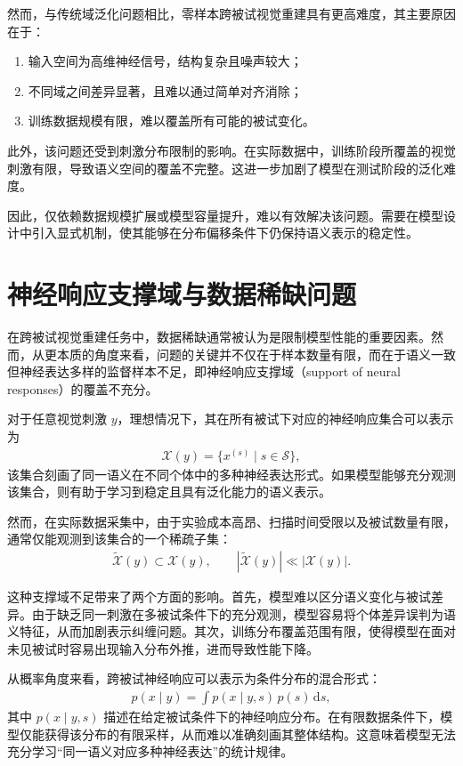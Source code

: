 然而，与传统域泛化问题相比，零样本跨被试视觉重建具有更高难度，其主要原因在于：
\begin{enumerate}
  \item 输入空间为高维神经信号，结构复杂且噪声较大；
  \item 不同域之间差异显著，且难以通过简单对齐消除；
  \item 训练数据规模有限，难以覆盖所有可能的被试变化。
\end{enumerate}

此外，该问题还受到刺激分布限制的影响。在实际数据中，训练阶段所覆盖的视觉刺激有限，导致语义空间的覆盖不完整。这进一步加剧了模型在测试阶段的泛化难度。

因此，仅依赖数据规模扩展或模型容量提升，难以有效解决该问题。需要在模型设计中引入显式机制，使其能够在分布偏移条件下仍保持语义表示的稳定性。

\section{神经响应支撑域与数据稀缺问题}

在跨被试视觉重建任务中，数据稀缺通常被认为是限制模型性能的重要因素。然而，从更本质的角度来看，问题的关键并不仅在于样本数量有限，而在于语义一致但神经表达多样的监督样本不足，即神经响应支撑域（support of neural responses）的覆盖不充分。

对于任意视觉刺激 $y$，理想情况下，其在所有被试下对应的神经响应集合可以表示为
\begin{align}
  \mathcal{X}(y) = \{x^{(s)} \mid s \in \mathcal{S}\},
\end{align}
该集合刻画了同一语义在不同个体中的多种神经表达形式。如果模型能够充分观测该集合，则有助于学习到稳定且具有泛化能力的语义表示。

然而，在实际数据采集中，由于实验成本高昂、扫描时间受限以及被试数量有限，通常仅能观测到该集合的一个稀疏子集：
\begin{align}
  \tilde{\mathcal{X}}(y) \subset \mathcal{X}(y), \qquad |\tilde{\mathcal{X}}(y)| \ll |\mathcal{X}(y)|.
\end{align}

这种支撑域不足带来了两个方面的影响。首先，模型难以区分语义变化与被试差异。由于缺乏同一刺激在多被试条件下的充分观测，模型容易将个体差异误判为语义特征，从而加剧表示纠缠问题。其次，训练分布覆盖范围有限，使得模型在面对未见被试时容易出现输入分布外推，进而导致性能下降。

从概率角度来看，跨被试神经响应可以表示为条件分布的混合形式：
\begin{align}
  p(x \mid y) = \int p(x \mid y,s)\, p(s) \, \mathrm{d}s,
\end{align}
其中 $p(x \mid y,s)$ 描述在给定被试条件下的神经响应分布。在有限数据条件下，模型仅能获得该分布的有限采样，从而难以准确刻画其整体结构。这意味着模型无法充分学习“同一语义对应多种神经表达”的统计规律。


